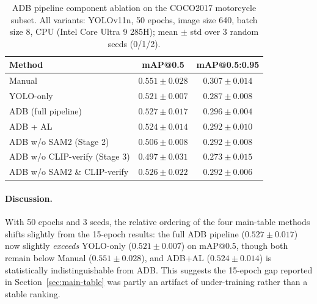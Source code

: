 \documentclass[11pt]{article}
\begin{document}
\begin{table}[h]
\centering
\caption{ADB pipeline component ablation on the COCO2017 motorcycle subset.
All variants: YOLOv11n, 50 epochs, image size 640, batch size 8, CPU (Intel
Core Ultra 9 285H); mean $\pm$ std over 3 random seeds (0/1/2).}
\label{tab:pipeline-ablation}
\begin{tabular}{@{}lcc@{}}
\toprule
Method & mAP@0.5 & mAP@0.5:0.95 \\
\midrule
Manual & $0.551 \pm 0.028$ & $\mathbf{0.307 \pm 0.014}$ \\
YOLO-only & $0.521 \pm 0.007$ & $0.287 \pm 0.008$ \\
ADB (full pipeline) & $\mathbf{0.527 \pm 0.017}$ & $0.296 \pm 0.004$ \\
ADB + AL & $0.524 \pm 0.014$ & $0.292 \pm 0.010$ \\
ADB w/o SAM2 (Stage 2) & $0.506 \pm 0.008$ & $0.292 \pm 0.008$ \\
ADB w/o CLIP-verify (Stage 3) & $0.497 \pm 0.031$ & $0.273 \pm 0.015$ \\
ADB w/o SAM2 \& CLIP-verify & $0.526 \pm 0.022$ & $0.292 \pm 0.006$ \\
\bottomrule
\end{tabular}
\end{table}

\paragraph{Discussion.} With 50 epochs and 3 seeds, the relative ordering of
the four main-table methods shifts slightly from the 15-epoch results: the
full ADB pipeline ($0.527 \pm 0.017$) now slightly \emph{exceeds} YOLO-only
($0.521 \pm 0.007$) on mAP@0.5, though both remain below Manual ($0.551 \pm
0.028$), and ADB+AL ($0.524 \pm 0.014$) is statistically indistinguishable
from ADB. This suggests the 15-epoch gap reported in
Section~\ref{sec:main-table} was partly an artifact of under-training rather
than a stable ranking.
\end{document}
